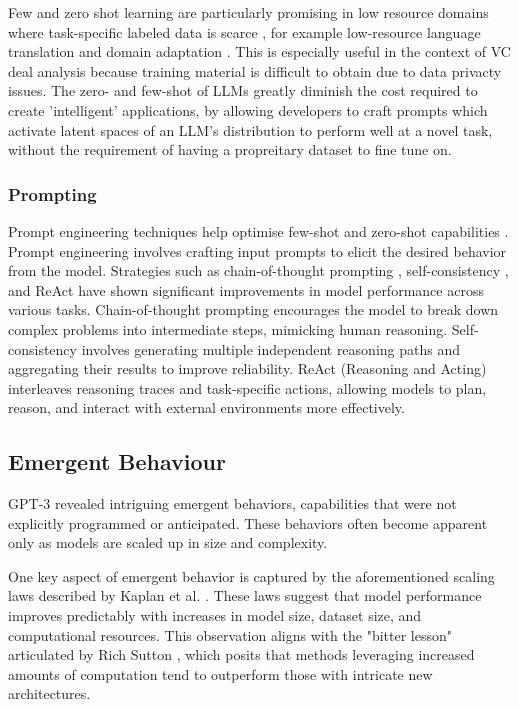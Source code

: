 \documentclass[a4paper, oneside]{discothesis}
\begin{document}
Few and zero shot learning are particularly promising in low resource domains where task-specific labeled data is scarce \cite{hedderich2021survey}, for example low-resource language translation \cite{garcia2020multilingual} and domain adaptation \cite{gururangan2020don}. This is especially useful in the context of VC deal analysis because training material is difficult to obtain due to data privacty issues. The zero- and few-shot  of LLMs greatly diminish the cost required to create 'intelligent' applications, by allowing developers to craft prompts which activate latent spaces of an LLM's distribution to perform well at a novel task, without the requirement of having a propreitary dataset to fine tune on.

\subsubsection{Prompting}

Prompt engineering techniques help optimise few-shot and zero-shot capabilities \cite{liu2021pre}. 
Prompt engineering involves crafting input prompts to elicit the desired behavior from the model. 
Strategies such as chain-of-thought prompting \cite{wei2022chain}, self-consistency \cite{wang2022self}, and ReAct \cite{yao2023react} have shown significant improvements in model performance across various tasks. Chain-of-thought prompting encourages the model to break down complex problems into intermediate steps, mimicking human reasoning. Self-consistency involves generating multiple independent reasoning paths and aggregating their results to improve reliability. ReAct (Reasoning and Acting) interleaves reasoning traces and task-specific actions, allowing models to plan, reason, and interact with external environments more effectively.

\subsection{Emergent Behaviour}
GPT-3 revealed intriguing emergent behaviors, capabilities that were not explicitly programmed or anticipated. These behaviors often become apparent only as models are scaled up in size and complexity.

One key aspect of emergent behavior is captured by the aforementioned scaling laws described by Kaplan et al. \cite{kaplan2020scaling}. These laws suggest that model performance improves predictably with increases in model size, dataset size, and computational resources. This observation aligns with the "bitter lesson" articulated by Rich Sutton \cite{sutton2019bitter}, which posits that methods leveraging increased amounts of computation tend to outperform those with intricate new architectures.
\end{document}
